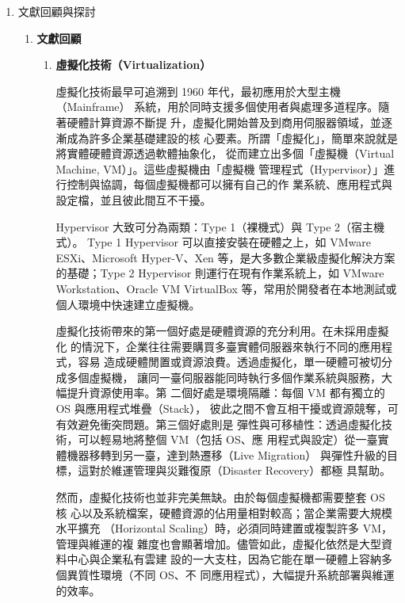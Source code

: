 \documentclass[12pt,a4paper]{article}
\begin{document}
\begin{enumerate}[label={(\zhdig*)}, leftmargin=2\parindent, listparindent=\parindent]
\begin{enumerate}[label={(\arabic*)}, leftmargin=\parindent, listparindent=\parindent]
\end{enumerate}
\item 文獻回顧與探討

\begin{enumerate}[label={(\arabic*)}, leftmargin=\parindent, listparindent=\parindent]
\item \textbf{文獻回顧}
\begin{enumerate}[label={(\zhdig*)}, leftmargin=2\parindent, listparindent=\parindent]

\item\textbf{虛擬化技術（Virtualization）\cite{8}}

    虛擬化技術最早可追溯到 1960 年代，最初應用於大型主機（Mainframe）
    系統，用於同時支援多個使用者與處理多道程序。隨著硬體計算資源不斷提
    升，虛擬化開始普及到商用伺服器領域，並逐漸成為許多企業基礎建設的核
    心要素。所謂「虛擬化」，簡單來說就是將實體硬體資源透過軟體抽象化，
    從而建立出多個「虛擬機（Virtual Machine, VM）」。這些虛擬機由「虛擬機
    管理程式（Hypervisor）」進行控制與協調，每個虛擬機都可以擁有自己的作
    業系統、應用程式與設定檔，並且彼此間互不干擾。

    Hypervisor 大致可分為兩類：Type 1（裸機式）與 Type 2（宿主機式）。
    Type 1 Hypervisor 可以直接安裝在硬體之上，如 VMware ESXi、Microsoft
    Hyper-V、Xen 等，是大多數企業級虛擬化解決方案的基礎；Type 2
    Hypervisor 則運行在現有作業系統上，如 VMware Workstation、Oracle VM
    VirtualBox 等，常用於開發者在本地測試或個人環境中快速建立虛擬機。

    虛擬化技術帶來的第一個好處是硬體資源的充分利用。在未採用虛擬化
    的情況下，企業往往需要購買多臺實體伺服器來執行不同的應用程式，容易
    造成硬體閒置或資源浪費。透過虛擬化，單一硬體可被切分成多個虛擬機，
    讓同一臺伺服器能同時執行多個作業系統與服務，大幅提升資源使用率。第
    二個好處是環境隔離：每個 VM 都有獨立的 OS 與應用程式堆疊（Stack），
    彼此之間不會互相干擾或資源競奪，可有效避免衝突問題。第三個好處則是
    彈性與可移植性：透過虛擬化技術，可以輕易地將整個 VM（包括 OS、應
    用程式與設定）從一臺實體機器移轉到另一臺，達到熱遷移（Live Migration）
    與彈性升級的目標，這對於維運管理與災難復原（Disaster Recovery）都極
    具幫助。

    然而，虛擬化技術也並非完美無缺。由於每個虛擬機都需要整套 OS 核
    心以及系統檔案，硬體資源的佔用量相對較高；當企業需要大規模水平擴充
    （Horizontal Scaling）時，必須同時建置或複製許多 VM，管理與維運的複
    雜度也會顯著增加。儘管如此，虛擬化依然是大型資料中心與企業私有雲建
    設的一大支柱，因為它能在單一硬體上容納多個異質性環境（不同 OS、不
    同應用程式），大幅提升系統部署與維運的效率。


\end{enumerate}
\end{enumerate}
\end{enumerate}
\end{document}
